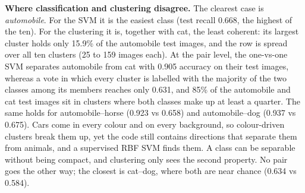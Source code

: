 \textbf{Where classification and clustering disagree.} The clearest case is \emph{automobile}. For the SVM it is
the easiest class (test recall 0.668, the highest of the ten). For the clustering it is, together with cat, the
least coherent: its largest cluster holds only 15.9\% of the automobile test images, and the row is spread over
all ten clusters (25 to 159 images each). At the pair level, the one-vs-one SVM separates automobile from cat
with 0.905 accuracy on their test images, whereas a vote in which every cluster is labelled with the majority of
the two classes among its members reaches only 0.631, and 85\% of the automobile and cat test images sit in
clusters where both classes make up at least a quarter. The same holds for automobile--horse (0.923 vs 0.658)
and automobile--dog (0.937 vs 0.675). Cars come in every colour and on every background, so colour-driven
clusters break them up, yet the code still contains directions that separate them from animals, and a supervised
RBF SVM finds them. A class can be separable without being compact, and clustering only sees the second
property. No pair goes the other way; the closest is cat--dog, where both are near chance (0.634 vs 0.584).

